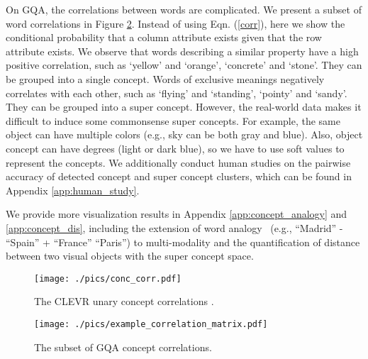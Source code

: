 \documentclass[10pt,twocolumn,letterpaper]{article}
\begin{document}
On GQA, the correlations between words are complicated. We present a subset of word correlations in Figure \ref{conc_corr_gqa}. Instead of using Eqn. (\ref{corr}), here we show the conditional probability that a column attribute exists given that the row attribute exists. We observe that words describing a similar property have a high positive correlation, such as `yellow' and `orange', `concrete' and `stone'. They can be grouped into a single concept. Words of exclusive meanings negatively correlates with each other, such as `flying' and `standing', `pointy' and `sandy'. They can be grouped into a super concept. However, the real-world data makes it difficult to induce some commonsense super concepts. For example, the same object can have multiple colors (e.g., sky can be both gray and blue). Also, object concept can have degrees (light or dark blue), so we have to use soft values to represent the concepts. We additionally conduct human studies on the pairwise accuracy of detected concept and super concept clusters, which can be found in Appendix \ref{app:human_study}.


We provide more visualization results in Appendix \ref{app:concept_analogy} and  \ref{app:concept_dis}, including the extension of word analogy~\cite{mikolov2013distributed} (e.g., ``Madrid'' - ``Spain'' + ``France''  ``Paris'') to multi-modality and the quantification of distance between two visual objects with the super concept space.




\begin{figure}[t]
\centering
\texttt{[image: ./pics/conc\_corr.pdf]}
\vspace{-3mm}
\caption{The CLEVR unary concept correlations .}
\label{conc_corr}
\vspace{-3mm}
\end{figure}

\begin{figure}[t]
\centering
\texttt{[image: ./pics/example\_correlation\_matrix.pdf]}
\vspace{-3mm}
\caption{The subset of GQA concept correlations.}
\label{conc_corr_gqa}
\vspace{-5mm}
\end{figure}
\vspace{-3mm}
\end{document}
